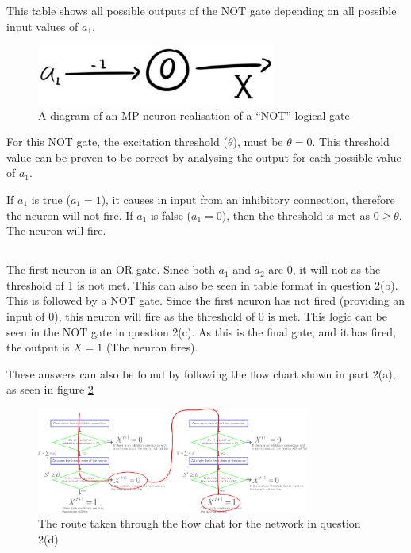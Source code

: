 \documentclass[a4paper]{report}
\begin{document}
This table shows all possible outputs of the NOT gate depending on all possible input values of \(a_1\).
\begin{figure}[H]
    \centering
    \includegraphics[width=0.7\textwidth]{images/not.png}
    \caption{A diagram of an MP-neuron realisation of a
        “NOT” logical gate}
    \label{fig:not}
\end{figure}

For this NOT gate, the excitation threshold (\(\theta\)), must be \(\theta = 0\). This threshold value can be proven to be correct by analysing the output for each possible value of \(a_1\).

If \(a_1\) is true (\(a_1 = 1\)), it causes in input from an inhibitory connection, therefore the neuron will not fire. If \(a_1\) is false (\(a_1 = 0\)), then the threshold is met as \(0 \geq \theta\). The neuron will fire.

\subsection{}
The first neuron is an OR gate. Since both \(a_1\) and \(a_2\) are 0, it will not as the threshold of 1 is not met. This can also be seen in table format in question 2(b). This is followed by a NOT gate. Since the first neuron has not fired (providing an input of 0), this neuron will fire as the threshold of 0 is met. This logic can be seen in the NOT gate in question 2(c). As this is the final gate, and it has fired, the output is \(X = 1\) (The neuron fires).

These answers can also be found by following the flow chart shown in part 2(a), as seen in figure \ref{fig:mpPath}

\begin{figure}[H]
    \centering
    \includegraphics[width=0.8\textwidth]{images/mpRoute.png}
    \caption{The route taken through the flow chat for the network in question 2(d)}
    \label{fig:mpPath}
\end{figure}
\end{document}

